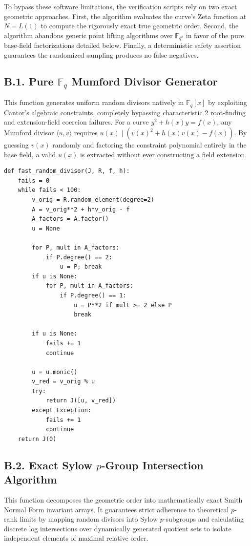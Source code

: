 \documentclass[letterpaper, 11pt]{article}
\begin{document}
To bypass these software limitations, the verification scripts rely on two exact geometric approaches. First, the algorithm evaluates the curve's Zeta function at $N = L(1)$ to compute the rigorously exact true geometric order. Second, the algorithm abandons generic point lifting algorithms over $\mathbb{F}_{q^2}$ in favor of the pure base-field factorizations detailed below. Finally, a deterministic safety assertion guarantees the randomized sampling produces no false negatives.

\subsection{B.1. Pure \texorpdfstring{$\mathbb{F}_q$}{F\_q} Mumford Divisor Generator}
This function generates uniform random divisors natively in $\mathbb{F}_q[x]$ by exploiting Cantor's algebraic constraints, completely bypassing characteristic 2 root-finding and extension-field coercion failures. For a curve $y^2+h(x)y=f(x)$, any Mumford divisor $\langle u, v \rangle$ requires $u(x) \mid (v(x)^2 + h(x)v(x) - f(x))$. By guessing $v(x)$ randomly and factoring the constraint polynomial entirely in the base field, a valid $u(x)$ is extracted without ever constructing a field extension.

\begin{lstlisting}
def fast_random_divisor(J, R, f, h):
    fails = 0
    while fails < 100:
        v_orig = R.random_element(degree=2)
        A = v_orig**2 + h*v_orig - f
        A_factors = A.factor()
        u = None
        
        for P, mult in A_factors:
            if P.degree() == 2:
                u = P; break
        if u is None:
            for P, mult in A_factors:
                if P.degree() == 1:
                    u = P**2 if mult >= 2 else P
                    break
                    
        if u is None:
            fails += 1
            continue
            
        u = u.monic()
        v_red = v_orig % u
        try:
            return J([u, v_red])
        except Exception:
            fails += 1
            continue
    return J(0) 
\end{lstlisting}

\subsection{B.2. Exact Sylow \texorpdfstring{$p$}{p}-Group Intersection Algorithm}
This function decomposes the geometric order into mathematically exact Smith Normal Form invariant arrays. It guarantees strict adherence to theoretical $p$-rank limits by mapping random divisors into Sylow $p$-subgroups and calculating discrete log intersections over dynamically generated quotient sets to isolate independent elements of maximal relative order.
\end{document}
